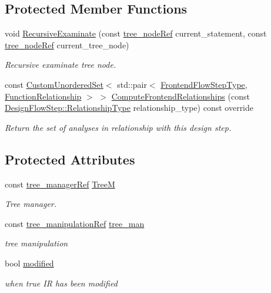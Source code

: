 \subsection*{Protected Member Functions}
\begin{DoxyCompactItemize}
\item 
void \hyperlink{classsoft__float__cg__ext_a3046064995739c8e40511505679140ae}{Recursive\+Examinate} (const \hyperlink{tree__node_8hpp_a6ee377554d1c4871ad66a337eaa67fd5}{tree\+\_\+node\+Ref} current\+\_\+statement, const \hyperlink{tree__node_8hpp_a6ee377554d1c4871ad66a337eaa67fd5}{tree\+\_\+node\+Ref} current\+\_\+tree\+\_\+node)
\begin{DoxyCompactList}\small\item\em Recursive examinate tree node. \end{DoxyCompactList}\item 
const \hyperlink{classCustomUnorderedSet}{Custom\+Unordered\+Set}$<$ std\+::pair$<$ \hyperlink{frontend__flow__step_8hpp_afeb3716c693d2b2e4ed3e6d04c3b63bb}{Frontend\+Flow\+Step\+Type}, \hyperlink{classFrontendFlowStep_af7cf30f2023e5b99e637dc2058289ab0}{Function\+Relationship} $>$ $>$ \hyperlink{classsoft__float__cg__ext_a52bc76adc5997ddea7031f84fbdd148e}{Compute\+Frontend\+Relationships} (const \hyperlink{classDesignFlowStep_a723a3baf19ff2ceb77bc13e099d0b1b7}{Design\+Flow\+Step\+::\+Relationship\+Type} relationship\+\_\+type) const override
\begin{DoxyCompactList}\small\item\em Return the set of analyses in relationship with this design step. \end{DoxyCompactList}\end{DoxyCompactItemize}
\subsection*{Protected Attributes}
\begin{DoxyCompactItemize}
\item 
const \hyperlink{tree__manager_8hpp_a96ff150c071ce11a9a7a1e40590f205e}{tree\+\_\+manager\+Ref} \hyperlink{classsoft__float__cg__ext_aeb01b7b86e7e9051d68b32144fdf070d}{TreeM}
\begin{DoxyCompactList}\small\item\em Tree manager. \end{DoxyCompactList}\item 
const \hyperlink{tree__manipulation_8hpp_a1a9460e3a2f9fc6a96cfd2f24cc9b2a5}{tree\+\_\+manipulation\+Ref} \hyperlink{classsoft__float__cg__ext_a7fc1708f8f3bed78162c5c1d5786acaa}{tree\+\_\+man}
\begin{DoxyCompactList}\small\item\em tree manipulation \end{DoxyCompactList}\item 
bool \hyperlink{classsoft__float__cg__ext_a65977082ca0b0daee164b8b245685f57}{modified}
\begin{DoxyCompactList}\small\item\em when true IR has been modified \end{DoxyCompactList}\end{DoxyCompactItemize}
